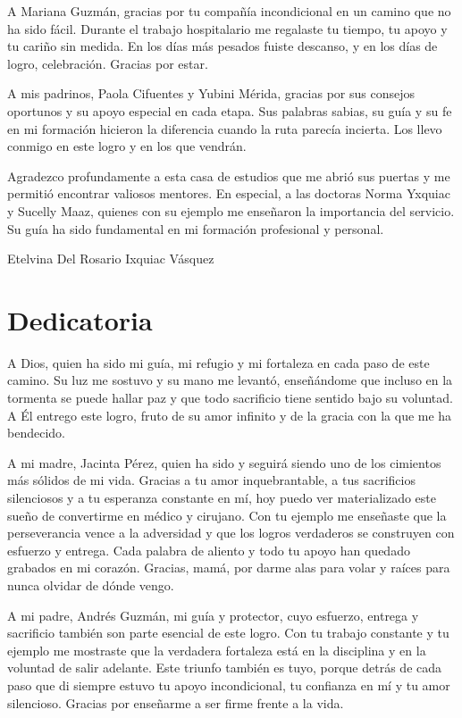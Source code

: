 \documentclass[11pt,letterpaper]{report}
\begin{document}
A Mariana Guzmán, gracias por tu compañía incondicional en un camino que no ha 
sido fácil. Durante el trabajo hospitalario me regalaste tu tiempo, tu apoyo y 
tu cariño sin medida. En los días más pesados fuiste descanso, y en los días 
de logro, celebración. Gracias por estar.

A mis padrinos, Paola Cifuentes y Yubini Mérida, gracias por sus consejos 
oportunos y su apoyo especial en cada etapa. Sus palabras sabias, su guía y su 
fe en mi formación hicieron la diferencia cuando la ruta parecía incierta. Los 
llevo conmigo en este logro y en los que vendrán.

Agradezco profundamente a esta casa de estudios que me abrió sus puertas y me 
permitió encontrar valiosos mentores. En especial, a las doctoras Norma Yxquiac 
y Sucelly Maaz, quienes con su ejemplo me enseñaron la importancia del servicio. 
Su guía ha sido fundamental en mi formación profesional y personal.

\begin{flushright}
Etelvina Del Rosario Ixquiac Vásquez
\end{flushright}

\chapter*{Dedicatoria}

A Dios, quien ha sido mi guía, mi refugio y mi fortaleza en cada paso de este 
camino. Su luz me sostuvo y su mano me levantó, enseñándome que incluso en la 
tormenta se puede hallar paz y que todo sacrificio tiene sentido bajo su 
voluntad. A Él entrego este logro, fruto de su amor infinito y de la gracia 
con la que me ha bendecido.

A mi madre, Jacinta Pérez, quien ha sido y seguirá siendo uno de los cimientos 
más sólidos de mi vida. Gracias a tu amor inquebrantable, a tus sacrificios 
silenciosos y a tu esperanza constante en mí, hoy puedo ver materializado este 
sueño de convertirme en médico y cirujano. Con tu ejemplo me enseñaste que la 
perseverancia vence a la adversidad y que los logros verdaderos se construyen 
con esfuerzo y entrega. Cada palabra de aliento y todo tu apoyo han quedado 
grabados en mi corazón. Gracias, mamá, por darme alas para volar y raíces 
para nunca olvidar de dónde vengo.

A mi padre, Andrés Guzmán, mi guía y protector, cuyo esfuerzo, entrega y 
sacrificio también son parte esencial de este logro. Con tu trabajo constante 
y tu ejemplo me mostraste que la verdadera fortaleza está en la disciplina y 
en la voluntad de salir adelante. Este triunfo también es tuyo, porque detrás 
de cada paso que di siempre estuvo tu apoyo incondicional, tu confianza en mí 
y tu amor silencioso. Gracias por enseñarme a ser firme frente a la vida.
\end{document}

